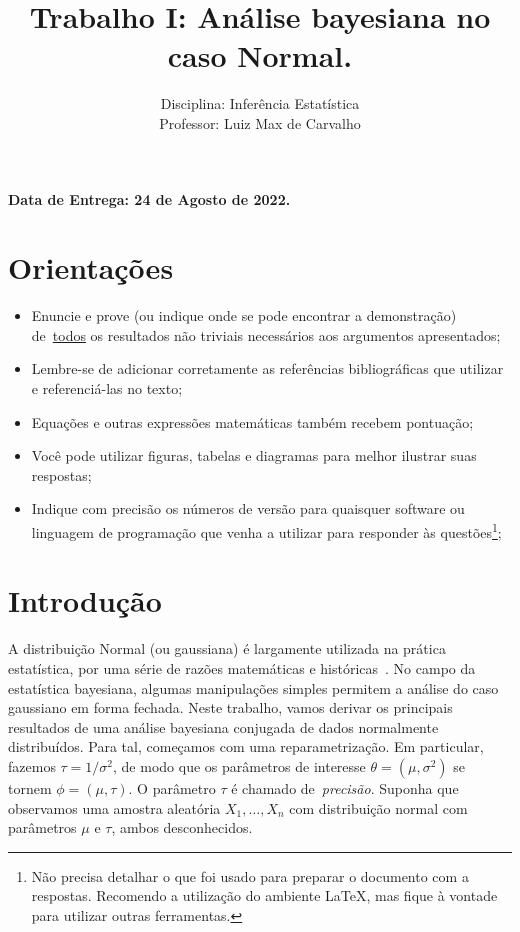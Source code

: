 \documentclass[a4paper,10pt, notitlepage]{report}
\title{Trabalho I: Análise bayesiana no caso Normal.}
\author{Disciplina: Inferência Estatística \\ Professor: Luiz Max de Carvalho}
\begin{document}
\maketitle

\textbf{Data de Entrega: 24 de Agosto de 2022.}

\section*{Orientações}
\begin{itemize}
 \item Enuncie e prove (ou indique onde se pode encontrar a demonstração) de~\underline{todos} os resultados não triviais necessários aos argumentos apresentados;
 \item Lembre-se de adicionar corretamente as referências bibliográficas que utilizar e referenciá-las no texto;
 \item Equações e outras expressões matemáticas também recebem pontuação;
 \item Você pode utilizar figuras, tabelas e diagramas para melhor ilustrar suas respostas;
 \item Indique com precisão os números de versão para quaisquer software ou linguagem de programação que venha a utilizar para responder às questões\footnote{Não precisa detalhar o que foi usado para preparar o documento com a respostas. Recomendo a utilização do ambiente LaTeX, mas fique à vontade para utilizar outras ferramentas.};
 \end{itemize}


\section*{Introdução}

A distribuição Normal (ou gaussiana) é largamente utilizada na prática estatística, por uma série de razões matemáticas e históricas~\citep{Kim2008}.
No campo da estatística bayesiana, algumas manipulações simples permitem a análise do caso gaussiano em forma fechada.
Neste trabalho, vamos derivar os principais resultados de uma análise bayesiana conjugada de dados normalmente distribuídos.
Para tal, começamos com uma reparametrização.
Em particular, fazemos $\tau = 1/\sigma^2$, de modo que os parâmetros de interesse $\theta = (\mu, \sigma^2)$ se tornem $\phi = (\mu, \tau)$.
O parâmetro $\tau$ é chamado de~\textit{precisão}.
Suponha que observamos uma amostra aleatória $X_1, \ldots, X_n$ com distribuição normal com parâmetros $\mu$ e $\tau$, ambos desconhecidos.
\end{document}
